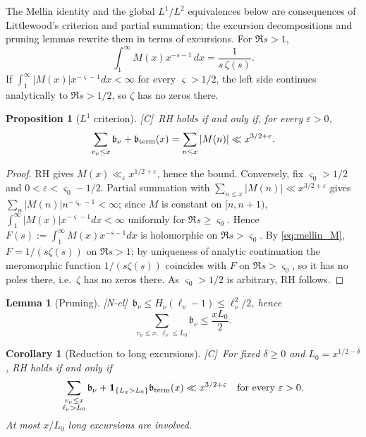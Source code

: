 \documentclass[11pt]{amsart}
\numberwithin{equation}{section}
\theoremstyle{plain}
\newtheorem{proposition}[theorem]{Proposition}
\newtheorem{lemma}[theorem]{Lemma}
\newtheorem{corollary}[theorem]{Corollary}
\theoremstyle{definition}
\theoremstyle{remark}
\newcommand{\eps}{\varepsilon}
\newcommand{\tagNE}{\textup{[N-el]}}
\newcommand{\tagC}{\textup{[C]}}
\begin{document}
The Mellin identity and the global $L^1/L^2$ equivalences below are
consequences of Littlewood's criterion and partial summation; the excursion
decompositions and pruning lemmas rewrite them in terms of excursions.
For $\Re s>1$,
\begin{equation}
\label{eq:mellin_M}
  \int_1^\infty M(x)x^{-s-1}\,dx=\frac{1}{s\,\zeta(s)} .
\end{equation}
If $\int_1^\infty|M(x)|x^{-\varsigma-1}dx<\infty$ for every $\varsigma>1/2$, the
left side continues analytically to $\Re s>1/2$, so $\zeta$ has no zeros
there.

\begin{proposition}[$L^1$ criterion]
\label{prop:L1}
\tagC\ RH holds if and only if, for every $\eps>0$,
\begin{equation}
\label{eq:L1_criterion}
  \sum_{v_\nu\le x}\mathfrak b_\nu+\mathfrak b_{\rm term}(x)=\sum_{n\le x}|M(n)|
  \ll x^{3/2+\eps}.
\end{equation}
\end{proposition}

\begin{proof}
RH gives $M(x)\ll_\eps x^{1/2+\eps}$, hence the bound. Conversely, fix
$\varsigma_0>1/2$ and $0<\eps<\varsigma_0-1/2$. Partial summation with
$\sum_{n\le x}|M(n)|\ll x^{3/2+\eps}$ gives
$\sum_n|M(n)|n^{-\varsigma_0-1}<\infty$; since $M$ is constant on
$[n,n+1)$, $\int_1^\infty|M(x)|x^{-\varsigma-1}dx<\infty$ uniformly for
$\Re s\ge\varsigma_0$. Hence $F(s):=\int_1^\infty M(x)x^{-s-1}dx$ is
holomorphic on $\Re s>\varsigma_0$. By \eqref{eq:mellin_M}, $F=1/(s\zeta(s))$
on $\Re s>1$; by uniqueness of analytic continuation the meromorphic function
$1/(s\zeta(s))$ coincides with $F$ on $\Re s>\varsigma_0$, so it has no poles
there, i.e.\ $\zeta$ has no zeros there. As $\varsigma_0>1/2$ is arbitrary,
RH follows.
\end{proof}

\begin{lemma}[Pruning]
\label{lem:pruning}
\tagNE\ $\mathfrak b_\nu\le H_\nu(\ell_\nu-1)\le\ell_\nu^2/2$, hence
\begin{equation}
\label{eq:pruning}
  \sum_{v_\nu\le x,\ \ell_\nu\le L_0}\mathfrak b_\nu\le\frac{xL_0}{2}.
\end{equation}
\end{lemma}

\begin{corollary}[Reduction to long excursions]
\label{cor:long}
\tagC\ For fixed $\delta\ge0$ and $L_0=x^{1/2-\delta}$, RH holds if and only if
\begin{equation}
\label{eq:long_reduction}
  \sum_{\substack{v_\nu\le x\\ \ell_\nu>L_0}}\mathfrak b_\nu
  +\mathbf 1_{\{L_x>L_0\}}\mathfrak b_{\rm term}(x)\ll x^{3/2+\eps}
  \quad\text{for every }\eps>0.
\end{equation}
At most $x/L_0$ long excursions are involved.
\end{corollary}
\end{document}
